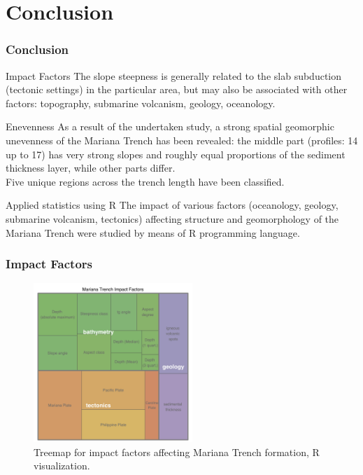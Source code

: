 \documentclass[pdflatex,compress,10pt,
	xcolor={dvipsnames,dvipsnames,svgnames,x11names,table},
	hyperref={colorlinks = true,breaklinks = true, urlcolor = NavyBlue, breaklinks = true}]{beamer}
\begin{document}
\section{Conclusion}
\begin{frame}\frametitle{Conclusion}

	\begin{exampleblock}{Impact Factors}
The slope steepness is generally related to the slab subduction (tectonic settings) in the particular area, but may also be associated with other factors: topography, submarine volcanism, geology, oceanology.
	\end{exampleblock}
	
	\begin{exampleblock}{Enevenness} As a result of the undertaken study, a strong spatial geomorphic unevenness of the Mariana Trench has been revealed: the middle part (profiles: 14 up to 17) has very strong slopes and roughly equal proportions of the sediment thickness layer, while other parts differ.\\ Five unique regions across the trench length have been classified.
	\end{exampleblock}
	
	\begin{alertblock}{Applied statistics using R}
	The impact of various factors (oceanology, geology, submarine volcanism, tectonics) affecting structure and geomorphology of the Mariana Trench were studied by means of R programming language.
	\end{alertblock}
\end{frame}

\begin{frame}\frametitle{Impact Factors}
\begin{figure}[H]
	\centering
		\includegraphics[width=6cm]{Fig-5-1.jpg}\caption{Treemap for impact factors affecting Mariana Trench formation, R visualization.}
\end{figure}		
\end{frame}
\end{document}
